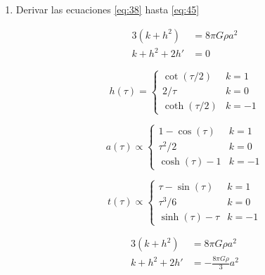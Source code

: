 \documentclass[a4paper]{article}
\begin{document}
\begin{enumerate}
	\item Derivar las ecuaciones \eqref{eq:38} hasta \eqref{eq:45}
	
	
\begin{equation}
\begin{aligned}
3(k + h^2) &= 8\pi G \rho a^2 \\
k + h^2 + 2h' &= 0
\end{aligned}
\tag{38}
\label{eq:38}
\end{equation}



\begin{equation}
h(\tau) = \begin{cases} 
\cot(\tau/2) & k = 1 \\ 
2/\tau & k = 0 \\ 
\coth(\tau/2) & k = -1 
\end{cases}
\tag{39}
\label{eq:39}
\end{equation}

\begin{equation}
a(\tau) \propto \begin{cases} 
1 - \cos(\tau) & k = 1 \\ 
\tau^2/2 & k = 0 \\ 
\cosh(\tau) - 1 & k = -1 
\end{cases}
\tag{40}
\label{eq:40}
\end{equation}

\begin{equation}
t(\tau) \propto \begin{cases} 
\tau - \sin(\tau) & k = 1 \\ 
\tau^3/6 & k = 0 \\ 
\sinh(\tau) - \tau & k = -1 
\end{cases}
\tag{41}
\label{eq:41}
\end{equation}

\begin{equation}
\begin{aligned}
3(k + h^2) &= 8\pi G \rho a^2 \\
k + h^2 + 2h' &= -\frac{8\pi G \rho}{3} a^2
\end{aligned}
\tag{42}
\label{eq:42}
\end{equation}


\end{enumerate}
\end{document}
